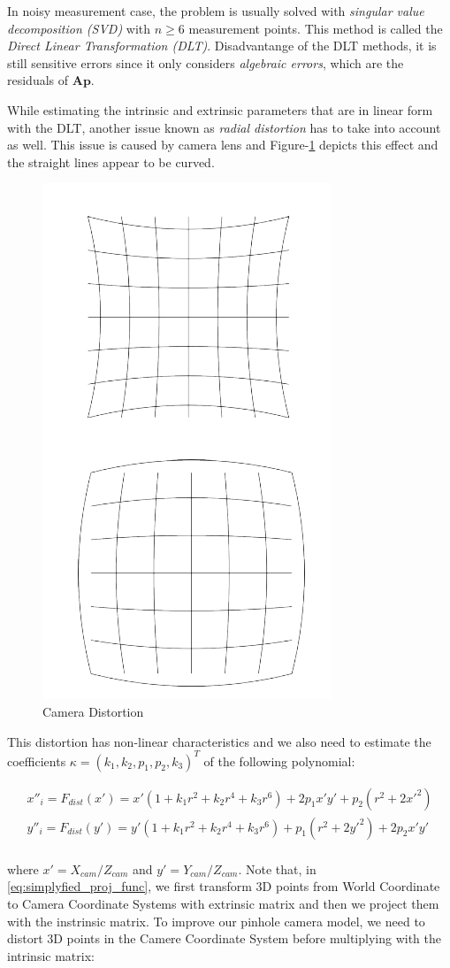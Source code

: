 \documentclass[a4paper]{report}
\numberwithin{figure}{section}
\begin{document}
In noisy measurement case, the problem is usually solved with
\textit{singular value decomposition (SVD)} with $n \geq 6$ measurement points. 
This method is called the \textit{Direct Linear Transformation (DLT)}.
Disadvantange of the DLT methods, it is still sensitive errors since 
it only considers \textit{algebraic errors}, which are the residuals of 
$\mathbf{Ap}$. 

While estimating the intrinsic and extrinsic parameters 
that are in linear form with the DLT, 
another issue known as \textit{radial distortion} 
has to take into account as well. This issue is caused by camera lens 
and Figure-\ref{fig:cam_distortion} depicts this effect and the straight lines 
appear to be curved. 

\begin{figure}[H]
	\centering
  \includegraphics[width=0.3\linewidth,natwidth=640,natheight=640]
  {fig/ref_imgs/cam_distortion.png}
  \caption{Camera Distortion}
  \label{fig:cam_distortion}
\end{figure}

This distortion has non-linear characteristics and we also 
need to estimate the coefficients 
$\kappa = (k_1, k_2, p_1, p_2, k_3)^T$ of the following polynomial:


\begin{equation}
\begin{split}
  x''_i = F_{dist}(x') = 
  x'(1+ k_1 r^2 + k_2 r^4 + k_3 r^6) + 2 p_1 x' y' + p_2 (r^2+2x'^2)\\
  y''_i = F_{dist}(y') = 
  y'(1+ k_1 r^2 + k_2 r^4 + k_3 r^6) + p_1 (r^2+2y'^2) + 2p_2 x'y'\\
\end{split}
\end{equation}

where $x' = X_{cam}/Z_{cam}$ and $y' = Y_{cam}/Z_{cam}$. 
Note that, in \ref{eq:simplyfied_proj_func}, we first transform 
3D points from World Coordinate to Camera Coordinate Systems with 
extrinsic matrix and then we project them with the instrinsic matrix. 
To improve our pinhole camera model, 
we need to distort 3D points in the Camere Coordinate System before 
multiplying with the intrinsic matrix:
\end{document}

